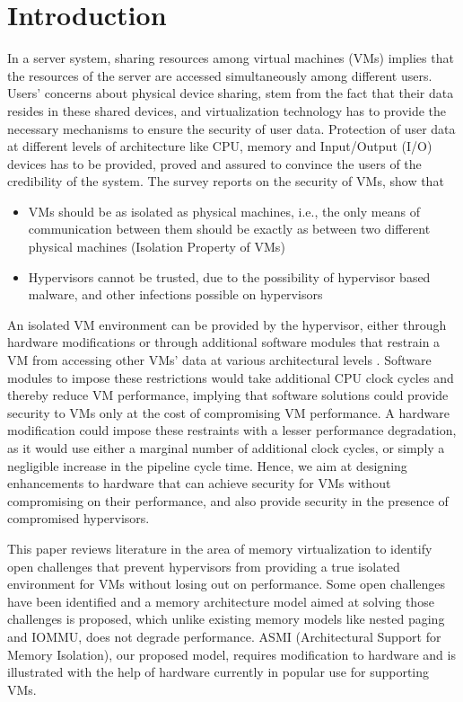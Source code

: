 \documentclass[a4paper,10pt,twocolumn]{article}
\begin{document}
\section{Introduction}
 In a  server system, sharing resources among virtual machines (VMs) implies that the resources of the server are accessed simultaneously among different users. Users' concerns about physical device sharing, stem from the fact that their data resides in these shared devices, and virtualization technology has to provide the necessary mechanisms to ensure the  security of user data. Protection of user data at different levels of architecture like CPU, memory and Input/Output (I/O) devices has to be provided, proved  and assured to convince the users of the credibility of the system. The survey reports \cite{jithin2014virtual} \cite{pearce2013virtualization} \cite{rehman2013virtual} on the security of VMs,  show that 
\begin{itemize}
  \item VMs  should be as isolated as physical machines, i.e., the only means of communication between them should be exactly as between two different physical machines (Isolation Property of VMs)
 \item Hypervisors cannot be trusted, due to the possibility of hypervisor based malware, and other infections possible on hypervisors
\end{itemize}
 An isolated VM environment can be provided by the hypervisor, either through hardware modifications or through additional software modules that restrain a VM from accessing  other VMs' data at various architectural levels \cite{jithin2014virtual}. Software modules to impose these restrictions would take additional CPU clock cycles and thereby  reduce  VM performance, implying that software solutions could  provide security to VMs only at the cost of compromising  VM performance. A hardware modification could impose these restraints with a lesser performance degradation, as it would use either a marginal number of additional clock cycles, or simply a negligible increase in the pipeline cycle time. Hence, we aim at designing enhancements to  hardware that can achieve security for  VMs without compromising on their performance, and also provide security in the presence of compromised hypervisors.

 This paper reviews literature in the area of memory virtualization to identify  open challenges that prevent hypervisors from providing a true isolated environment for VMs without losing out on performance. Some open challenges have been identified and  a  memory architecture model aimed at  solving  those challenges is proposed, which unlike existing memory models like nested paging and IOMMU, does not degrade performance. ASMI (Architectural Support for Memory Isolation),  our proposed  model, requires modification to hardware and is illustrated with the help of hardware currently in  popular use for supporting VMs.
\end{document}
